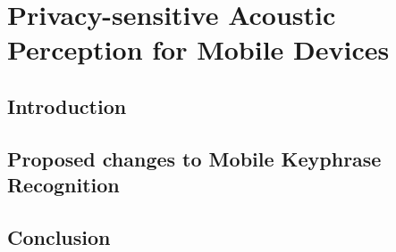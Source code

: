 \chapter{Privacy-sensitive Acoustic Perception for Mobile Devices}

\section{Introduction}













\section{Proposed changes to Mobile Keyphrase Recognition}
\label{sec:proposed_changes_to_mobile}





\section{Conclusion}

